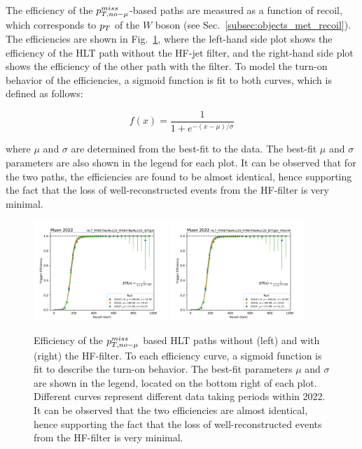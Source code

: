 The efficiency of the $p_{T,no-\mu}^{miss}$-based paths are measured as a function of recoil, which corresponds to $p_T$ of the $W$ boson (see Sec.~\ref{subsec:objects_met_recoil}). 
The efficiencies are shown in Fig.~\ref{fig:filterhf_efficiency}, where the left-hand side plot shows the efficiency of the HLT path without the HF-jet filter, and the right-hand side plot
shows the efficiency of the other path with the filter. To model the turn-on behavior of the efficiencies, a sigmoid function is fit to both curves, which is defined as follows:

\begin{equation}
    f(x) = \frac{1}{1 + e^{-(x - \mu)/\sigma}}
\end{equation}

where $\mu$ and $\sigma$ are determined from the best-fit to the data. The best-fit $\mu$ and $\sigma$ parameters are also shown in the legend for each plot.
It can be observed that for the two paths, the efficiencies are found to be almost identical, hence
supporting the fact that the loss of well-reconstructed events from the HF-filter is very minimal.  

\begin{figure}[htbp]
    \centering
    \includegraphics[width=0.45\textwidth]{HFFilter/merged_2022-10-27_hlt_Muon_2022_JMEtriggers/turnons_tr_metnomu.pdf}
    \includegraphics[width=0.45\textwidth]{HFFilter/merged_2022-10-27_hlt_Muon_2022_JMEtriggers/turnons_tr_metnomu_filterhf.pdf}
    \caption{Efficiency of the $p_{T,no-\mu}^{miss}$ based HLT paths without (left) and with (right) the HF-filter. To each efficiency curve, a sigmoid function is fit
    to describe the turn-on behavior. The best-fit parameters $\mu$ and $\sigma$ are shown in the legend, located on the bottom right of each plot. Different curves
    represent different data taking periods within 2022.
    It can be observed that the two efficiencies are almost identical, hence supporting the fact that the loss of well-reconstructed 
    events from the HF-filter is very minimal.}
    \label{fig:filterhf_efficiency}
\end{figure}

